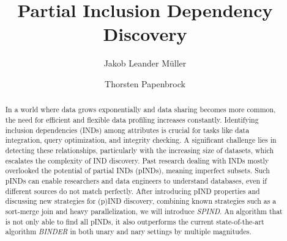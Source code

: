 \documentclass[sigconf, nonacm]{acmart}
\begin{document}
\title{Partial Inclusion Dependency Discovery}

\author{Jakob Leander Müller}

\author{Thorsten Papenbrock}


\begin{abstract}
In a world where data grows exponentially and data sharing becomes more common, the need for efficient and flexible data profiling increases constantly.  Identifying inclusion dependencies (INDs) among attributes is crucial for tasks like data integration, query optimization, and integrity checking. A significant challenge lies in detecting these relationships, particularly with the increasing size of datasets, which escalates the complexity of IND discovery.
Past research dealing with INDs mostly overlooked the potential of partial INDs (pINDs), meaning imperfect subsets. Such pINDs can enable researchers and data engineers to understand databases, even if different sources do not match perfectly. After introducing pIND properties and discussing new strategies for (p)IND discovery, combining known strategies such as a sort-merge join and heavy parallelization, we will introduce \textit{SPIND}. An algorithm that is not only able to find all pINDs, it also outperforms the current state-of-the-art algorithm \textit{BINDER} in both unary and nary settings by multiple magnitudes.
\end{abstract}

\maketitle
\end{document}
